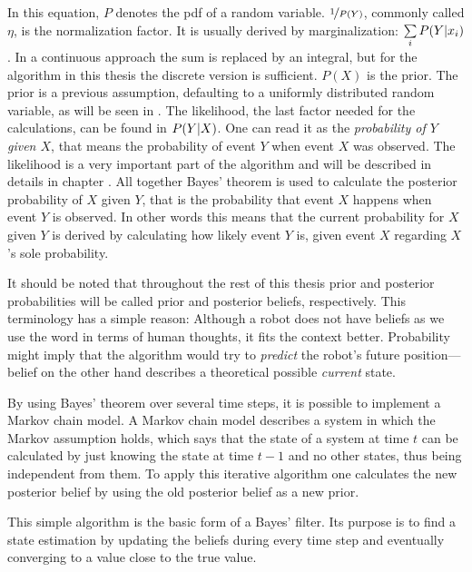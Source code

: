 \documentclass[Thesis.tex]{subfiles}
\begin{document}
In this equation, $P$ denotes the \gls{pdf} of a random variable. $\nicefrac{1}{P(Y)}$, commonly called $\eta$, is the normalization factor. It is usually derived by marginalization: $\sum\limits_i \p[P]{Y}{x_i}$. In a continuous approach the sum is replaced by an integral, but for the algorithm in this thesis the discrete version is sufficient. $P(X)$ is the prior. The prior is a previous assumption, defaulting to a uniformly distributed random variable, as will be seen in . The likelihood, the last factor needed for the calculations, can be found in $\p[P]{Y}{X}$. One can read it as the \emph{probability of $Y$ given $X$}, that means the probability of event $Y$ when event $X$ was observed. 
The likelihood is a very important part of the algorithm and will be described in details in chapter . All together Bayes' theorem is used to calculate the posterior probability of $X$ given $Y$, that is the probability that event $X$ happens when event $Y$ is observed. In other words this means that the current probability for $X$ given $Y$ is derived by calculating how likely event $Y$ is, given event $X$ regarding $X$'s sole probability. 

It should be noted that throughout the rest of this thesis prior and posterior probabilities will be called prior and posterior beliefs, respectively. This terminology has a simple reason: Although a robot does not have beliefs as we use the word in terms of human thoughts, it fits the context better. Probability might imply that the algorithm would try to \emph{predict} the robot's future position---belief on the other hand describes a theoretical possible \emph{current} state.

\bigskip

By using Bayes' theorem over several time steps, it is possible to implement a Markov chain model. A Markov chain model describes a system in which the Markov assumption holds, which says that the state of a system at time $t$ can be calculated by just knowing the state at time $t-1$ and no other states, thus being independent from them.
To apply this iterative algorithm one calculates the new posterior belief by using the old posterior belief as a new prior.


This simple algorithm is the basic form of a Bayes' filter. Its purpose is to find a state estimation by updating the beliefs during every time step and eventually converging to a value close to the true value.
\end{document}
